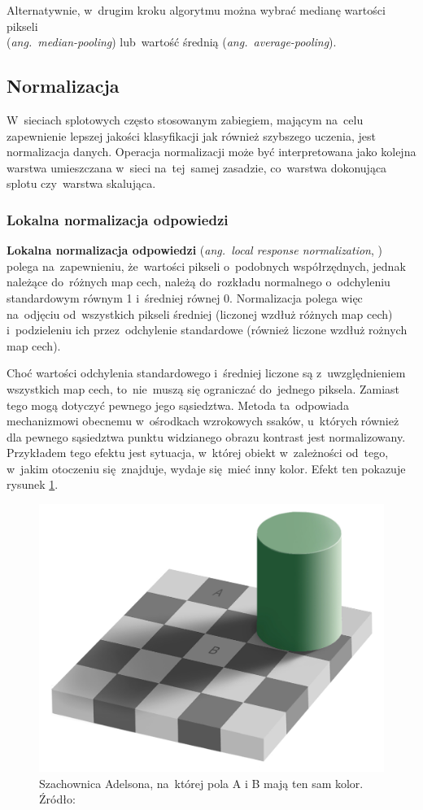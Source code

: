 Alternatywnie, w~drugim kroku algorytmu można wybrać medianę wartości pikseli\\
(\textit{ang.~median-pooling}) lub~wartość średnią (\textit{ang.~average-pooling}).

\subsection{Normalizacja}
W~sieciach splotowych często stosowanym zabiegiem, mającym na~celu zapewnienie lepszej jakości klasyfikacji jak również
szybszego uczenia, jest normalizacja danych. Operacja normalizacji może być interpretowana jako kolejna warstwa
umieszczana w~sieci na~tej~samej zasadzie, co~warstwa dokonująca splotu czy~warstwa skalująca.

\subsubsection{Lokalna normalizacja odpowiedzi} \label{sssec:normalizacja_odpowiedzi}
\textbf{Lokalna normalizacja odpowiedzi} (\textit{ang.~local response normalization}, \cite{HOG}) polega na~zapewnieniu,
że~wartości pikseli o~podobnych współrzędnych, jednak należące do~różnych map cech, należą do~rozkładu normalnego
o~odchyleniu standardowym równym 1 i~średniej równej 0. Normalizacja polega więc na~odjęciu od~wszystkich pikseli
średniej (liczonej wzdłuż różnych map cech) i~podzieleniu ich przez~odchylenie standardowe (również liczone wzdłuż
rożnych map cech).

Choć wartości odchylenia standardowego i~średniej liczone są z~uwzględnieniem wszystkich map cech, to~nie~muszą
się ograniczać do~jednego piksela. Zamiast tego mogą dotyczyć pewnego jego sąsiedztwa. Metoda ta~odpowiada
mechanizmowi obecnemu w~ośrodkach wzrokowych ssaków, u~których również dla pewnego sąsiedztwa punktu widzianego
obrazu kontrast jest normalizowany. Przykładem tego efektu jest sytuacja, w~której obiekt w~zależności od~tego,
w~jakim otoczeniu się~znajduje, wydaje się~mieć inny kolor. Efekt ten pokazuje rysunek \ref{img:chess-illusion}.

\begin{figure}[H]
	\centering
	\includegraphics[width=0.8\linewidth]{img/chess-illusion.png}
	\caption{Szachownica Adelsona, na~której pola A i B mają ten sam kolor. Źródło: \cite{adelson-checker-illusion}}
	\label{img:chess-illusion}
\end{figure}


